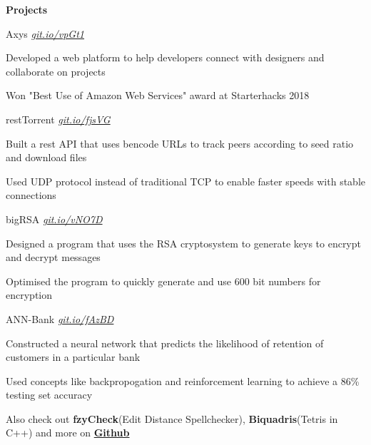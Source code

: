 \documentclass{resume} %
\begin{document}

\begin{rSection}{\textbf{Projects}}
  
  \begin{rSubsection}{Axys}
	  {\em {\href{https://github.com/MSJawad/AXYS}
		    {git.io/vpGt1}}}
	  {}

    \item Developed a web platform to help developers connect with designers and collaborate on projects
    \item Won "Best Use of Amazon Web Services" award at Starterhacks 2018
      
  \end{rSubsection}

	\begin{rSubsection}{restTorrent}
		{\em {\href{https://github.com/MSJawad/restTorrent}
				{git.io/fjsVG}}}
		{}
		
		\item Built a rest API that uses bencode URLs to track peers according to seed ratio and download files
		\item Used UDP protocol instead of traditional TCP to enable faster speeds with stable connections
		
	\end{rSubsection}

  \begin{rSubsection}{bigRSA}
	  {\em {\href{https://github.com/MSJawad/bigRSA}
		    {git.io/vNO7D}}}
	  {}

    \item Designed a program that uses the RSA cryptosystem to generate keys to encrypt and decrypt messages
    \item Optimised the program to quickly generate and use 600 bit numbers for encryption
    
    \end{rSubsection}
    
   \begin{rSubsection}{ANN-Bank}
	  {\em {\href{https://github.com/MSJawad/ANN-Bank-Solutions}
		    {git.io/fAzBD}}}
	  {}

    \item Constructed a neural network that predicts the likelihood of retention of customers in a particular bank
    \item Used concepts like backpropogation and reinforcement learning to achieve a 86\% testing set accuracy
   
    
  \end{rSubsection}

  \begin{rMinisection}
    \item {Also check out}{ \textbf{fzyCheck}(Edit Distance Spellchecker)},
      {\textbf{Biquadris}(Tetris in C++)} and more on
      \href{https://github.com/MSJawad}{\textbf{Github}}
  \end{rMinisection}
\end{rSection}
\end{document}

